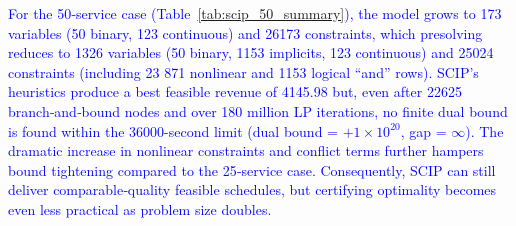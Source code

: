 \documentclass[Afour,sagev,times]{sagej}
\newcommand{\primero}[1]{\textcolor{blue}{#1}}
\begin{document}
\primero{
For the 50‐service case (Table~\ref{tab:scip_50_summary}), the model grows to 173 variables (50 binary, 123 continuous) and 26173 constraints, which presolving reduces to 1326 variables (50 binary, 1153 implicits, 123 continuous) and 25024 constraints (including 23 871 nonlinear and 1153 logical ``and'' rows). SCIP’s heuristics produce a best feasible revenue of 4145.98 but, even after 22625 branch‐and‐bound nodes and over 180 million LP iterations, no finite dual bound is found within the 36000-second limit (dual bound = \(+1\times10^{20}\), gap = $\infty$). The dramatic increase in nonlinear constraints and conflict terms further hampers bound tightening compared to the 25‐service case. Consequently, SCIP can still deliver comparable‐quality feasible schedules, but certifying optimality becomes even less practical as problem size doubles.
}
\end{document}
